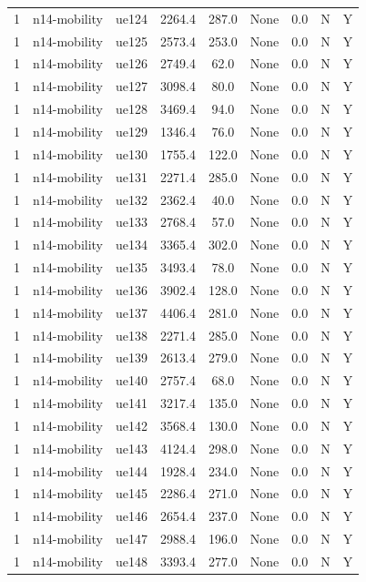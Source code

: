 \begin{table}[ht]
\begin{tabular}{|c|c|c|c|c|c|c|c|c|}
1 & n14-mobility & ue124 & 2264.4 & 287.0 & None & 0.0 & N & Y \\
1 & n14-mobility & ue125 & 2573.4 & 253.0 & None & 0.0 & N & Y \\
1 & n14-mobility & ue126 & 2749.4 & 62.0 & None & 0.0 & N & Y \\
1 & n14-mobility & ue127 & 3098.4 & 80.0 & None & 0.0 & N & Y \\
1 & n14-mobility & ue128 & 3469.4 & 94.0 & None & 0.0 & N & Y \\
1 & n14-mobility & ue129 & 1346.4 & 76.0 & None & 0.0 & N & Y \\
1 & n14-mobility & ue130 & 1755.4 & 122.0 & None & 0.0 & N & Y \\
1 & n14-mobility & ue131 & 2271.4 & 285.0 & None & 0.0 & N & Y \\
1 & n14-mobility & ue132 & 2362.4 & 40.0 & None & 0.0 & N & Y \\
1 & n14-mobility & ue133 & 2768.4 & 57.0 & None & 0.0 & N & Y \\
1 & n14-mobility & ue134 & 3365.4 & 302.0 & None & 0.0 & N & Y \\
1 & n14-mobility & ue135 & 3493.4 & 78.0 & None & 0.0 & N & Y \\
1 & n14-mobility & ue136 & 3902.4 & 128.0 & None & 0.0 & N & Y \\
1 & n14-mobility & ue137 & 4406.4 & 281.0 & None & 0.0 & N & Y \\
1 & n14-mobility & ue138 & 2271.4 & 285.0 & None & 0.0 & N & Y \\
1 & n14-mobility & ue139 & 2613.4 & 279.0 & None & 0.0 & N & Y \\
1 & n14-mobility & ue140 & 2757.4 & 68.0 & None & 0.0 & N & Y \\
1 & n14-mobility & ue141 & 3217.4 & 135.0 & None & 0.0 & N & Y \\
1 & n14-mobility & ue142 & 3568.4 & 130.0 & None & 0.0 & N & Y \\
1 & n14-mobility & ue143 & 4124.4 & 298.0 & None & 0.0 & N & Y \\
1 & n14-mobility & ue144 & 1928.4 & 234.0 & None & 0.0 & N & Y \\
1 & n14-mobility & ue145 & 2286.4 & 271.0 & None & 0.0 & N & Y \\
1 & n14-mobility & ue146 & 2654.4 & 237.0 & None & 0.0 & N & Y \\
1 & n14-mobility & ue147 & 2988.4 & 196.0 & None & 0.0 & N & Y \\
1 & n14-mobility & ue148 & 3393.4 & 277.0 & None & 0.0 & N & Y \\

\end{tabular}
\end{table}
